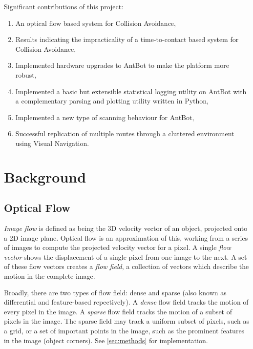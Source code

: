 \documentclass[a4paper,12pt,twoside,openright]{article}
\begin{document}
Significant contributions of this project:
\begin{enumerate}
  \item{An optical flow based system for Collision Avoidance,}
  \item{Results indicating the impracticality of a time-to-contact based system for Collision Avoidance,}
  \item{Implemented hardware upgrades to AntBot to make the platform more robust,}
  \item{Implemented a basic but extensible statistical logging utility on AntBot with a complementary parsing and plotting utility written in Python,} 
  \item{Implemented a new type of scanning behaviour for AntBot,}
  \item{Successful replication of multiple routes through a cluttered environment using Visual Navigation.}
  \end{enumerate}
\newpage

\section{ Background}
\subsection{ Optical Flow }
\textit{Image flow} is defined as being the 3D velocity vector of an object, projected onto a
2D image plane\cite{ODonovan2005}. Optical flow is an approximation of this, working from a series
of images to compute the projected velocity vector for a pixel. A single \textit{flow vector}
shows the displacement of a single pixel from one image to the next. A set of these flow vectors
creates a \textit{flow field}, a collection of vectors which describe the motion in the complete image.
\newline

Broadly, there are two types of flow field: dense and sparse (also known as differential and
feature-based repectively\cite{Low2005}). A \textit{dense} flow field tracks
the motion of every pixel in the image. A \textit{sparse} flow field tracks the motion of a subset
of pixels in the image. The sparse field may track a uniform subset of pixels, such as a grid, or a
set of important points in the image, such as the prominent features in the image (object corners).
See \ref{sec:methods} for implementation.
\end{document}
